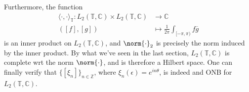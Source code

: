 \documentclass[notoc,notitlepage]{tufte-book}
\begin{document}
\begin{remark}
  Furthermore, the function
  \begin{align*}
    \langle \cdot, \cdot \rangle_{\mathbb{T}}
    : L_2(\mathbb{T}, \mathbb{C}) \times L_2(\mathbb{T}, \mathbb{C}) &\to \mathbb{C} \\
    ([f], [g]) &\mapsto \frac{1}{2 \pi} \int_{[-\pi, \pi)} f \overline{g}
  \end{align*}
  is an inner product on $L_2(\mathbb{T}, \mathbb{C})$,
  and $\norm{\cdot}_2$ is precisely the norm induced by the inner product.
  By what we've seen in the last section, $L_2(\mathbb{T}, \mathbb{C})$
  is complete wrt the norm $\norm{\cdot}$, and is therefore a Hilbert space.
  One can finally verify that $\{[\xi_n]\}_{n \in \mathbb{Z}}$,
  where $\xi_n(\epsilon) = e^{in \theta}$,
  is indeed and ONB for $L_2(\mathbb{T}, \mathbb{C})$.
\end{remark}
\end{document}
